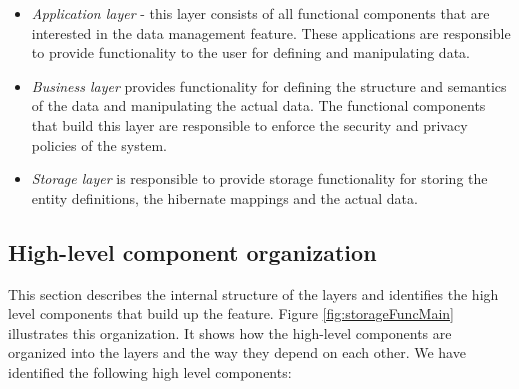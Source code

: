 \begin{itemize}
	\item \textit{Application layer} - this layer consists of all functional components that are interested in the data management feature. These applications are responsible to provide functionality to the user for defining and manipulating data.
	
	\item \textit{Business layer} provides functionality for defining the structure and semantics of the data and manipulating the actual data. The functional components that build this layer are responsible to enforce the security and privacy policies of the system.
	
	\item \textit{Storage layer } is responsible to provide storage functionality for storing the entity definitions, the hibernate mappings and the actual data.
\end{itemize}

\subsection{High-level component organization}
This section describes the internal structure of the layers and identifies the high level components that build up the feature. Figure \ref{fig:storageFuncMain} illustrates this organization. It shows how the high-level components are organized into the layers and the way they depend on each other. We have identified the following high level components:


